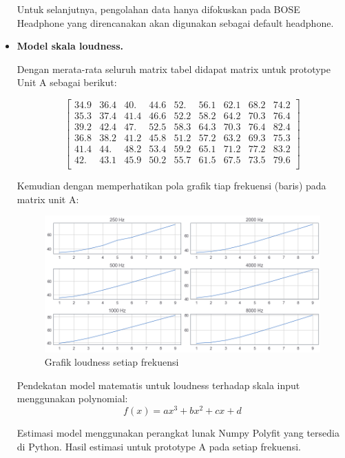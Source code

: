 \documentclass[12pt,]{article}
\begin{document}
\begin{itemize}
		Untuk selanjutnya, pengolahan data hanya difokuskan pada BOSE Headphone yang direncanakan akan
		digunakan sebagai default headphone.

		\item \textbf{Model skala loudness.}

		Dengan merata-rata seluruh matrix tabel didapat matrix untuk prototype Unit A sebagai berikut:

		\[\left[
		\begin{matrix}
			34.9 & 36.4 & 40. &  44.6 & 52. &  56.1 & 62.1 & 68.2 & 74.2\\
			35.3 & 37.4 & 41.4 & 46.6 & 52.2 & 58.2 & 64.2 & 70.3 & 76.4\\
			39.2 & 42.4 & 47. & 52.5 & 58.3 & 64.3 & 70.3 & 76.4 & 82.4\\
			36.8 & 38.2 & 41.2 & 45.8 & 51.2 & 57.2 & 63.2 & 69.3 & 75.3\\
			41.4 & 44. &  48.2 & 53.4 & 59.2 & 65.1 & 71.2 & 77.2 & 83.2\\
			42. &  43.1 & 45.9 & 50.2 & 55.7 & 61.5 & 67.5 & 73.5 & 79.6\\
		\end{matrix}
		\right]\]

		Kemudian dengan memperhatikan pola grafik tiap frekuensi (baris) pada matrix unit A:
		\begin{figure}[!ht]
			\centering
			\includegraphics[width=400pt]{images/graph/boseprotoA}
			\caption{Grafik loudness setiap frekuensi}
		\end{figure}

		Pendekatan model matematis untuk loudness terhadap skala input menggunakan polynomial:\\
		\[f(x) = ax^3 + bx^2 + cx + d\]

		Estimasi model menggunakan perangkat lunak Numpy Polyfit yang tersedia di Python.
		Hasil estimasi untuk prototype A pada setiap frekuensi.


\end{itemize}
\end{document}
